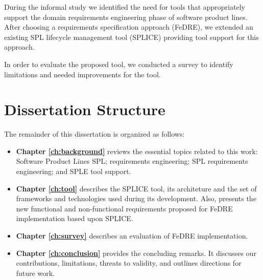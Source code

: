 During the informal study we identified the need for tools that appropriately support the domain 
requirements engineering phase of software product lines. After choosing a requirements specification 
approach (\ac{FeDRE}), we extended an existing SPL lifecycle management tool (\ac{SPLICE}) providing tool support 
for this approach.

In order to evaluate the proposed tool, we conducted a survey to identify limitations and needed 
improvements for the tool.  

\section{Dissertation Structure}
\label{sc:structure}
The remainder of this dissertation is organized as follows:

\begin{itemize}
\item \textbf{ Chapter \ref{ch:background} } reviews the essential topics
related to this work: Software Product Lines \ac{SPL}; requirements
engineering; \ac{SPL} requirements engineering; and \ac{SPLE} tool support.

\item \textbf{ Chapter \ref{ch:tool} } describes the \ac{SPLICE} tool, its
architeture and the set of frameworks and technologies used during its development. Also,  presents the new functional and non-functional 
requirements proposed for \ac{FeDRE} implementation based upon \ac{SPLICE}.

\item \textbf{ Chapter \ref{ch:survey} } describes an evaluation of \ac{FeDRE}
implementation.

\item \textbf{ Chapter \ref{ch:conclusion} } provides the concluding remarks. It
discusses our contributions, limitations, threats to validity, and outlines directions for future work.




\end{itemize}

